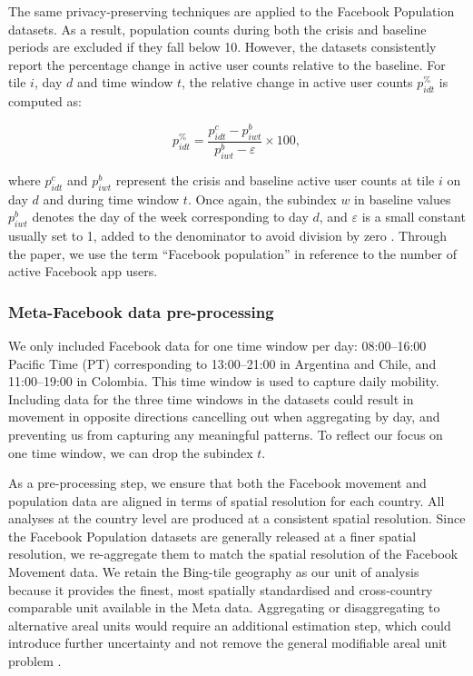 \documentclass[fleqn,10pt]{wlscirep}
\begin{document}
The same privacy-preserving techniques are applied to the Facebook Population datasets.
As a result, population counts during both the crisis and baseline periods are excluded if they fall below 10. However, the datasets consistently report the percentage change in active user counts relative to the baseline. For tile $i$, day $d$ and time window $t$, the relative change in active user counts $p^{\%}_{idt}$ is computed as:

\begin{equation}
   p^{\%}_{idt} = \dfrac{p^{c}_{idt} - p^b_{iwt}}{p^b_{iwt} - \varepsilon}\times 100, 
\end{equation}

where $p^c_{idt}$ and $p^b_{iwt}$ represent the crisis and baseline active user counts at tile $i$ on day $d$ and during time window $t$. Once again, the subindex $w$ in baseline values $p^b_{iwt}$ denotes the day of the week corresponding to day $d$, and $\varepsilon$ is a small constant usually set to 1, added to the denominator to avoid division by zero \cite{Maas19}. Through the paper, we use the term ``Facebook population'' in reference to the number of active Facebook app users.

\subsubsection*{Meta-Facebook data pre-processing}

We only included Facebook data for one time window per day: 08:00–16:00 Pacific Time (PT) corresponding to 13:00–21:00 in Argentina and Chile, and 11:00–19:00 in Colombia. This time window is used to capture daily mobility. Including data for the three time windows in the datasets could result in movement in opposite directions cancelling out when aggregating by day, and preventing us from capturing any meaningful patterns. To reflect our focus on one time window, we can drop the subindex $t$.

As a pre-processing step, we ensure that both the Facebook movement and population data are aligned in terms of spatial resolution for each country. All analyses at the country level are produced at a consistent spatial resolution. Since the Facebook Population datasets are generally released at a finer spatial resolution, we re-aggregate them to match the spatial resolution of the Facebook Movement data. We retain the Bing-tile geography as our unit of analysis because it provides the finest, most spatially standardised and cross-country comparable unit available in the Meta data. Aggregating or disaggregating to alternative areal units would require an additional estimation step, which could introduce further uncertainty and not remove the general modifiable areal unit problem \cite{openshaw83}.
\end{document}
